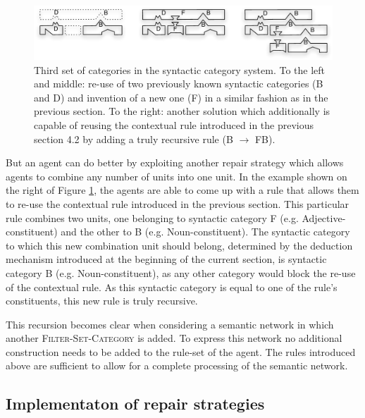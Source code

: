 \begin{figure}[htbp]
  \begin{center}
    \includegraphics[width=\textwidth]{./composition/figures/mapping-3.pdf}
    \caption[Third set of categories in the syntactic category
    system]{Third set of categories in the syntactic category system. To
      the left and middle: re-use of two previously known syntactic
      categories (B and D) and invention of a new one (F) in a similar
      fashion as in the previous section. To the right: another
      solution which additionally is capable of reusing the contextual
      rule introduced in the previous section 4.2 by adding a truly
      recursive rule (B $\rightarrow$ FB).}
    \label{f:map-syntactic-categories-3}
  \end{center}
\end{figure}

But an agent can do better by exploiting another repair strategy
which allows agents to combine any number of units into one unit. In
the example shown on the right of Figure
\ref{f:map-syntactic-categories-3}, the agents are able to come up
with a rule that allows them to re-use the contextual rule introduced
in the previous section. This particular rule combines two units, one
belonging to syntactic category F (e.g. Adjective-constituent) and the
other to B (e.g. Noun-constituent). The syntactic category to which
this new combination unit should belong, determined by the deduction
mechanism introduced at the beginning of the current section, is
syntactic category B (e.g. Noun-constituent), as any other category
would block the re-use of the contextual rule. As this syntactic
category is equal to one of the rule's constituents, this new rule is
truly recursive.

This recursion becomes clear when considering a semantic network in
which another \textsc{Filter-Set-Category} is added. To express this
network no additional construction needs to be added to the rule-set of
the agent. The rules introduced above are sufficient to allow for a
complete processing of the semantic network.

\subsection{Implementaton of repair strategies}
\label{s:irl-fcg-repair-strategies}

